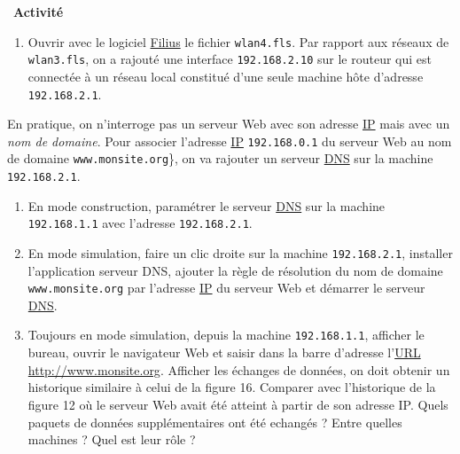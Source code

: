\documentclass[
  11pt,
]{article}
\newcommand{\passthrough}[1]{#1}
\providecommand{\tightlist}{%
  \setlength{\itemsep}{0pt}\setlength{\parskip}{0pt}}
\newcounter{activite}
\newenvironment{activite}[1]
{\par \medskip   \noindent   \addtocounter{activite}{1}
\begin{bclogo}[arrondi =0.1,   noborder = true, logo=\bcvelo, marge=4]{~\textbf{Activité} \textbf{\theactivite} {\itshape #1} }  \par}
{
\end{bclogo}
 \par \bigskip }
\newcounter{def}
\newcounter{logi}
\newcounter{histo}
\begin{document}
\begin{activite}{}

\begin{enumerate}
\def\labelenumi{\arabic{enumi}.}
\tightlist
\item
  Ouvrir avec le logiciel
  \href{https://www.lernsoftware-filius.de/Herunterladen}{Filius} le
  fichier \passthrough{\lstinline!wlan4.fls!}. Par rapport aux réseaux
  de \passthrough{\lstinline!wlan3.fls!}, on a rajouté une interface
  \passthrough{\lstinline!192.168.2.10!} sur le routeur qui est
  connectée à un réseau local constitué d'une seule machine hôte
  d'adresse \passthrough{\lstinline!192.168.2.1!}.
\end{enumerate}

En pratique, on n'interroge pas un serveur Web avec son adresse
\href{https://fr.wikipedia.org/wiki/Internet_Protocol}{IP} mais avec un
\emph{nom de domaine}. Pour associer l'adresse
\href{https://fr.wikipedia.org/wiki/Internet_Protocol}{IP}
\passthrough{\lstinline!192.168.0.1!} du serveur Web au nom de domaine
\passthrough{\lstinline!www.monsite.org!}\}, on va rajouter un serveur
\href{https://fr.wikipedia.org/wiki/Domain_Name_System}{DNS} sur la
machine \passthrough{\lstinline!192.168.2.1!}.

\begin{enumerate}
\def\labelenumi{\arabic{enumi}.}
\setcounter{enumi}{1}
\item
  En mode construction, paramétrer le serveur
  \href{https://fr.wikipedia.org/wiki/Domain_Name_System}{DNS} sur la
  machine \passthrough{\lstinline!192.168.1.1!} avec l'adresse
  \passthrough{\lstinline!192.168.2.1!}.
\item
  En mode simulation, faire un clic droite sur la machine
  \passthrough{\lstinline!192.168.2.1!}, installer l'application serveur
  DNS, ajouter la règle de résolution du nom de domaine
  \passthrough{\lstinline!www.monsite.org!} par l'adresse
  \href{https://fr.wikipedia.org/wiki/Internet_Protocol}{IP} du serveur
  Web et démarrer le serveur
  \href{https://fr.wikipedia.org/wiki/Domain_Name_System}{DNS}.
\item
  Toujours en mode simulation, depuis la machine
  \passthrough{\lstinline!192.168.1.1!}, afficher le bureau, ouvrir le
  navigateur Web et saisir dans la barre d'adresse
  l'\href{https://fr.wikipedia.org/wiki/Uniform_Resource_Locator}{URL}
  \url{http://www.monsite.org}. Afficher les échanges de données, on
  doit obtenir un historique similaire à celui de la figure 16. Comparer
  avec l'historique de la figure 12 où le serveur Web avait été atteint
  à partir de son adresse IP. Quels paquets de données supplémentaires
  ont été echangés ? Entre quelles machines ? Quel est leur rôle ?
\end{enumerate}

\end{activite}
\end{document}
